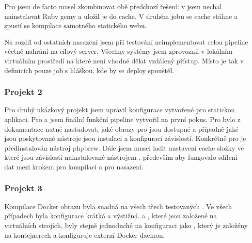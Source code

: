             Pro \semaphore jsem de facto musel zkombinovat obě předchozí řešení: v  jsem nechal nainstalovat Ruby gemy a uložil je do cache. V druhém jobu se cache stáhne a spustí se kompilace samotného statického webu.

            Na rozdíl od ostatních nasazení jsem při testování  neimplementovat celou \CI pipeline včetně nahrání na cílový server. Všechny systémy jsem zprovoznil v lokálním virtuálním prostředí na které není vhodné dělat vzdálený přístup. Místo  je tak v definicích pouze job s hláškou, kde by se deploy spouštěl.

        \subsubsection{Projekt 2}
            Pro druhý ukázkový projekt jsem upravil konfigurace vytvořené pro statickou aplikaci. Pro \circleci a \travis jsem finální funkční pipeline vytvořil na první pokus. Pro \semaphore bylo z dokumentace nutné nastudovat, jaké obrazy pro  jsou dostupné a případně jaké jsou poskytované nástroje jsou instalaci a konfiguraci závislostí. Konkrétně pro  je předinstalován nástroj phpbrew. Dále jsem musel ladit nastavení cache složky  ve které jsou závislosti nainstalované nástrojem , především aby fungovalo sdílení dat mezi krokem pro kompilaci a pro nasazení.

        \subsubsection{Projekt 3}
            Kompilace Docker obrazu byla snadná na všech třech testovaných  \CI. Ve všech případech byla konfigurace krátká a výstižná. \travis a \semaphore, které jsou založené na virtuálních strojích, byly stejně jednoduché na konfiguraci jako \circleci, který je založény na kontejnerech a konfiguruje externí Docker daemon.
